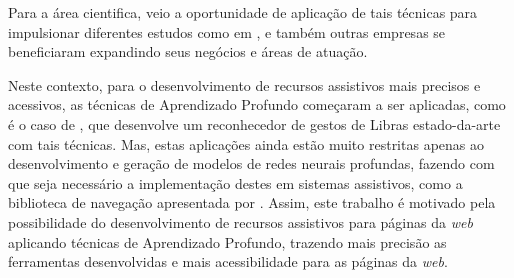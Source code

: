 \par Para a área cientifica, veio a oportunidade de aplicação de tais técnicas para impulsionar diferentes estudos como em \cite{Frid-Adar2018, Caroline2016}, e também outras empresas se beneficiaram expandindo seus negócios e áreas de atuação.

\par Neste contexto, para o desenvolvimento de recursos assistivos mais precisos e acessivos, as técnicas de Aprendizado Profundo começaram a ser aplicadas, como é o caso de , que desenvolve um reconhecedor de gestos de Libras estado-da-arte com tais técnicas. Mas, estas aplicações ainda estão muito restritas apenas ao desenvolvimento e geração de modelos de redes neurais profundas, fazendo com que seja necessário a implementação destes em sistemas assistivos, como a biblioteca de navegação apresentada por \cite{handsfree2019}. Assim, este trabalho é motivado pela possibilidade do desenvolvimento de recursos assistivos para páginas da \textit{web} aplicando técnicas de Aprendizado Profundo, trazendo mais precisão as ferramentas desenvolvidas e mais acessibilidade para as páginas da \textit{web}.












